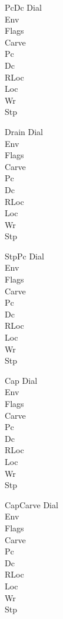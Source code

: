 \documentclass[a4paper,10pt,fleqn]{article}
\begin{document}
\begin{schema}{PcDc}
  \Xi Dial \\ \Xi Env \\ \Xi Flags \\ \Xi Carve \\ \Delta Pc \\ \Delta Dc \\
  \Xi RLoc \\ \Xi Loc \\ \Xi Wr \\ \Xi Stp
\end{schema}

\begin{schema}{Drain}
  \Delta Dial \\ \Xi Env \\ \Xi Flags \\ \Xi Carve \\ \Delta Pc \\ \Xi Dc \\
  \Xi RLoc \\ \Delta Loc \\ \Xi Wr \\ \Xi Stp
\end{schema}

\begin{schema}{StpPc}
  \Xi Dial \\ \Xi Env \\ \Xi Flags \\ \Xi Carve \\ \Delta Pc \\ \Xi Dc \\
  \Xi RLoc \\ \Xi Loc \\ \Xi Wr \\ \Delta Stp
\end{schema}

\begin{schema}{Cap}
  \Delta Dial \\ \Xi Env \\ \Delta Flags \\ \Xi Carve \\ \Delta Pc \\ \Xi Dc \\
  \Xi RLoc \\ \Xi Loc \\ \Xi Wr \\ \Xi Stp
\end{schema}

\begin{schema}{CapCarve}
  \Delta Dial \\ \Xi Env \\ \Delta Flags \\ \Delta Carve \\ \Delta Pc \\ \Xi Dc \\
  \Xi RLoc \\ \Xi Loc \\ \Xi Wr \\ \Xi Stp
\end{schema}
\end{document}
